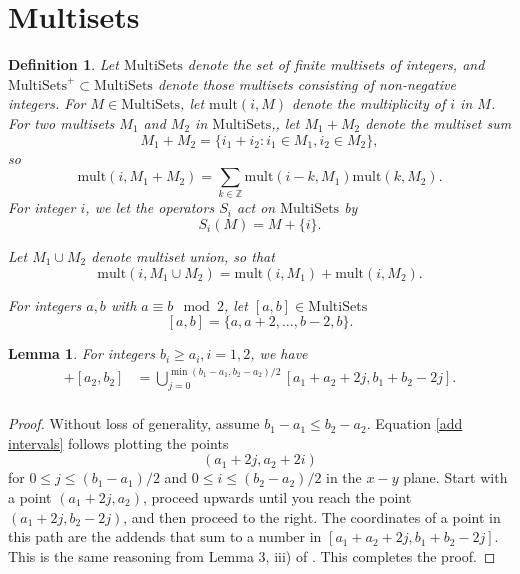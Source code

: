 \documentclass[11pt, oneside]{article}   	%
\newtheorem{lemma}{Lemma}
\newtheorem{definition}{Definition}
\newcommand{\mult}{\mathrm{mult}}
\newcommand{\semi}{\mathrm{semi}}
\begin{document}
\section{Multisets} \label{s ms}
\begin{definition} 
Let $\mathrm{MultiSets}$ denote the set of finite multisets of integers, and $\mathrm{MultiSets}^+ \subset \mathrm{MultiSets}$ denote those multisets consisting of non-negative integers. 
For $M \in \mathrm{MultiSets}$, let $\mult(i,M)$ denote the multiplicity of $i$ in $M$.
For two multisets $M_1$ and $M_2$ in $\mathrm{MultiSets}$,, let $M_1+M_2$ denote the multiset sum
\[
M_1+M_2 = \{ i_1+i_2 \colon i_1 \in M_1, i_2 \in M_2\},
\]
so 
\[
\mult(i,M_1+M_2) = \sum_{k \in \mathbb{Z}} \mult(i-k, M_1) \mult(k, M_2).
\]
For integer $i$, we let the operators $S_i$ act on $\mathrm{MultiSets}$ by 
\[
S_i(M) = M + \{ i\}.
\]

Let $M_1 \cup M_2$ denote multiset union, so that 
\[
\mult(i, M_1 \cup M_2) = \mult(i,M_1)+\mult(i,M_2). 
\]

For integers $a,b$ with $a \equiv b \mod 2$, let $[a,b] \in \mathrm{MultiSets}$
\[
[a,b] = \{ a, a+2, \dots, b-2,b \}.
\]

\end{definition} 

\begin{lemma} \label{l mn}
For integers $b_i \geq a_i, i=1,2$, we have
\begin{align}
[a_1,b_1]+[a_2,b_2] &= \bigcup_{j=0}^{\min(b_1-a_1, b_2-a_2)/2} [a_1+a_2+2j, b_1+b_2-2j]. \label{add intervals}\\ 
\end{align}
\end{lemma}

\begin{proof}
Without loss of generality, assume $b_1-a_1\leq b_2-a_2$. Equation \eqref{add intervals} follows plotting the points 
 \[
 (a_1+2j, a_2+2i)
 \]
 for $0 \leq j \leq (b_1-a_1)/2$ and $0 \leq i \leq (b_2-a_2)/2$ in the $x-y$ plane. Start with a point $(a_1+2j,a_2)$, proceed upwards until you reach the point $(a_1+2j,b_2-2j)$, and then proceed to the right. The coordinates of a point in this path are the addends that sum to a number in $[a_1+a_2+2j, b_1+b_2-2j]$. This is the same reasoning from Lemma 3, iii) of \cite{DeFranco}. This completes the proof. 
\end{proof} 
\end{document}
